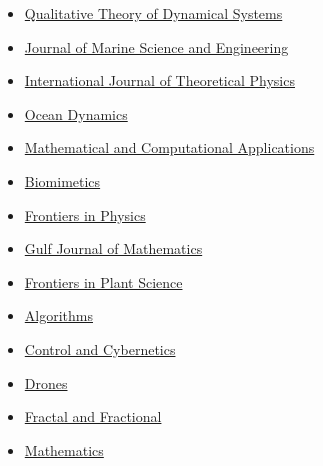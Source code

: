 \begin{itemize}
    \item[$\blacktriangleright$] \href{https://link.springer.com/journal/12346}%
    {Qualitative Theory of Dynamical Systems}

    \item[$\blacktriangleright$] \href{https://www.mdpi.com/journal/jmse/}%
    {Journal of Marine Science and Engineering}

    \item[$\blacktriangleright$] \href{https://link.springer.com/journal/10773/}%
    {International Journal of Theoretical Physics}

    \item[$\blacktriangleright$] \href{https://link.springer.com/journal/10236/}%
    {Ocean Dynamics}
    
    \item[$\blacktriangleright$] \href{https://www.mdpi.com/journal/mca/}%
    {Mathematical and Computational Applications}

    \item[$\blacktriangleright$] \href{https://www.mdpi.com/journal/biomimetics/}%
    {Biomimetics}

    \item[$\blacktriangleright$] \href{https://www.frontiersin.org/journals/physics/}%
    {Frontiers in Physics}

    \item[$\blacktriangleright$] \href{https://gjom.org/}%
    {Gulf Journal of Mathematics}

    \item[$\blacktriangleright$] \href{https://www.frontiersin.org/journals/plant-science/}%
    {Frontiers in Plant Science}

    \item[$\blacktriangleright$] \href{https://www.mdpi.com/journal/algorithms/}%
    {Algorithms}

    \item[$\blacktriangleright$] \href{http://control.ibspan.waw.pl:3000/mainpage/}%
    {Control and Cybernetics}

    \item[$\blacktriangleright$] \href{https://www.mdpi.com/journal/drones/}%
    {Drones}

    \item[$\blacktriangleright$] \href{https://www.mdpi.com/journal/fractalfract/}%
    {Fractal and Fractional}

    \item[$\blacktriangleright$] \href{https://www.mdpi.com/journal/mathematics/}%
    {Mathematics}


\end{itemize}
